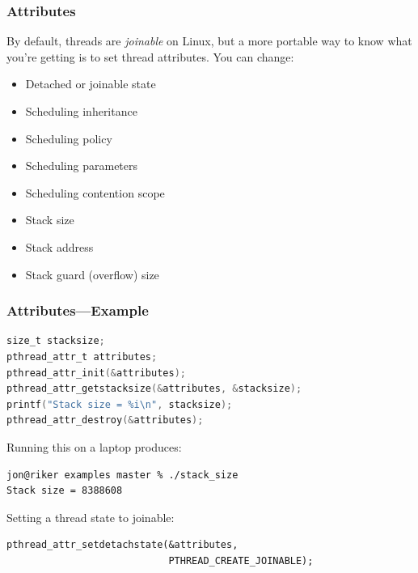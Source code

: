 \begin{frame}
  \frametitle{Attributes}


  By default, threads are {\it joinable} on Linux, but a more portable way to
  know what you're getting is to set thread attributes. You can change:
  \begin{itemize}
    \item Detached or joinable state
    \item Scheduling inheritance
    \item Scheduling policy
    \item Scheduling parameters
    \item Scheduling contention scope
    \item Stack size
    \item Stack address
    \item Stack guard (overflow) size
  \end{itemize}


\end{frame}

\begin{frame}[fragile]
  \frametitle{Attributes---Example}


  \begin{lstlisting}[language=C]
size_t stacksize;
pthread_attr_t attributes;
pthread_attr_init(&attributes);
pthread_attr_getstacksize(&attributes, &stacksize);
printf("Stack size = %i\n", stacksize);
pthread_attr_destroy(&attributes);
  \end{lstlisting}
Running this on a laptop produces:
  \begin{lstlisting}
jon@riker examples master % ./stack_size 
Stack size = 8388608
  \end{lstlisting}
  Setting a thread state to joinable:
  \begin{lstlisting}
pthread_attr_setdetachstate(&attributes,
                            PTHREAD_CREATE_JOINABLE);
  \end{lstlisting}


\end{frame}

